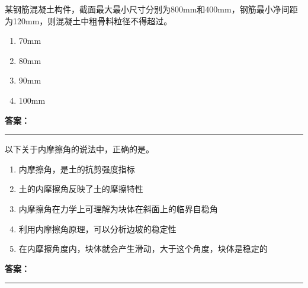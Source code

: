\documentclass[UTF8,fontset=fandol,11pt]{ctexart}
\newcommand{\answerline}{\textcolor{answerred}{\rule{2.4cm}{0.7pt}}}
\begin{document}
\begin{quizbox}[title={乱序第 162 题｜第四章混凝土结构工程}]

某钢筋混凝土构件，截面最大最小尺寸分别为800mm和400mm，钢筋最小净间距为120mm，则混凝土中粗骨料粒径不得超过。\\

\begin{enumerate}[label=\Alph*.]

\item 70mm

\item 80mm

\item 90mm

\item 100mm

\end{enumerate}

\textbf{\textcolor{answerred}{答案：}} \answerline

\end{quizbox}

\vspace{0.2em}

\begin{quizbox}[title={乱序第 163 题｜第一章土方工程}]

以下关于内摩擦角的说法中，正确的是。\\

\begin{enumerate}[label=\Alph*.]

\item 内摩擦角，是土的抗剪强度指标

\item 土的内摩擦角反映了土的摩擦特性

\item 内摩擦角在力学上可理解为块体在斜面上的临界自稳角

\item 利用内摩擦角原理，可以分析边坡的稳定性

\item 在内摩擦角度内，块体就会产生滑动，大于这个角度，块体是稳定的

\end{enumerate}

\textbf{\textcolor{answerred}{答案：}} \answerline

\end{quizbox}

\vspace{0.2em}
\end{document}
